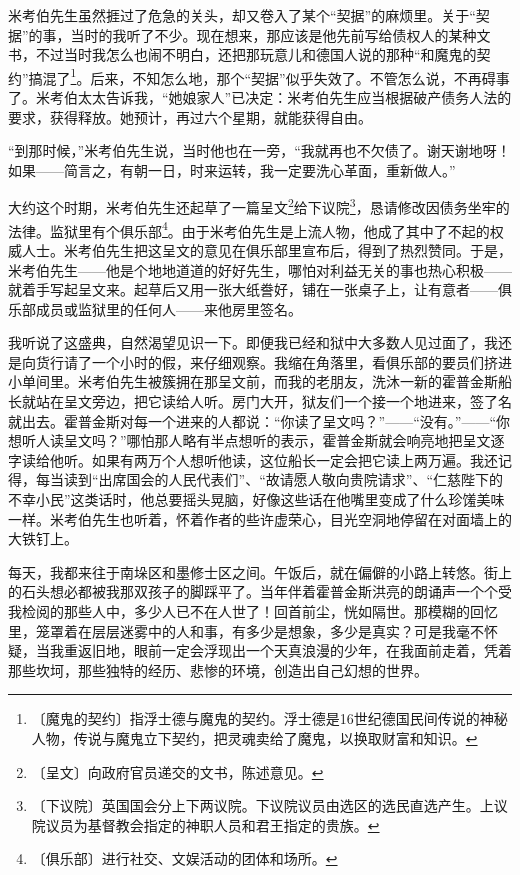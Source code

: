 \documentclass[12pt,UTF-8,openany]{ctexbook}
\begin{document}
\begin{normalsize}
    米考伯先生虽然捱过了危急的关头，却又卷入了某个“契据”的麻烦里。关于“契据”的事，当时的我听了不少。现在想来，那应该是他先前写给债权人的某种文书，不过当时我怎么也闹不明白，还把那玩意儿和德国人说的那种“和魔鬼的契约”搞混了\footnote{〔魔鬼的契约〕指浮士德与魔鬼的契约。浮士德是16世纪德国民间传说的神秘人物，传说与魔鬼立下契约，把灵魂卖给了魔鬼，以换取财富和知识。}。后来，不知怎么地，那个“契据”似乎失效了。不管怎么说，不再碍事了。米考伯太太告诉我，“她娘家人”已决定：米考伯先生应当根据破产债务人法的要求，获得释放。她预计，再过六个星期，就能获得自由。
    
    “到那时候，”米考伯先生说，当时他也在一旁，“我就再也不欠债了。谢天谢地呀！如果——简言之，有朝一日，时来运转，我一定要洗心革面，重新做人。”
    
    大约这个时期，米考伯先生还起草了一篇呈文\footnote{〔呈文〕向政府官员递交的文书，陈述意见。}给下议院\footnote{〔下议院〕英国国会分上下两议院。下议院议员由选区的选民直选产生。上议院议员为基督教会指定的神职人员和君王指定的贵族。}，恳请修改因债务坐牢的法律。监狱里有个俱乐部\footnote{〔俱乐部〕进行社交、文娱活动的团体和场所。}。由于米考伯先生是上流人物，他成了其中了不起的权威人士。米考伯先生把这呈文的意见在俱乐部里宣布后，得到了热烈赞同。于是，米考伯先生——他是个地地道道的好好先生，哪怕对利益无关的事也热心积极——就着手写起呈文来。起草后又用一张大纸誊好，铺在一张桌子上，让有意者——俱乐部成员或监狱里的任何人——来他房里签名。
    
    我听说了这盛典，自然渴望见识一下。即便我已经和狱中大多数人见过面了，我还是向货行请了一个小时的假，来仔细观察。我缩在角落里，看俱乐部的要员们挤进小单间里。米考伯先生被簇拥在那呈文前，而我的老朋友，洗沐一新的霍普金斯船长就站在呈文旁边，把它读给人听。房门大开，狱友们一个接一个地进来，签了名就出去。霍普金斯对每一个进来的人都说：“你读了呈文吗？”——“没有。”——“你想听人读呈文吗？”哪怕那人略有半点想听的表示，霍普金斯就会响亮地把呈文逐字读给他听。如果有两万个人想听他读，这位船长一定会把它读上两万遍。我还记得，每当读到“出席国会的人民代表们”、“故请愿人敬向贵院请求”、“仁慈陛下的不幸小民”这类话时，他总要摇头晃脑，好像这些话在他嘴里变成了什么珍馐美味一样。米考伯先生也听着，怀着作者的些许虚荣心，目光空洞地停留在对面墙上的大铁钉上。
    
    每天，我都来往于南垛区和墨修士区之间。午饭后，就在偏僻的小路上转悠。街上的石头想必都被我那双孩子的脚踩平了。当年伴着霍普金斯洪亮的朗诵声一个个受我检阅的那些人中，多少人已不在人世了！回首前尘，恍如隔世。那模糊的回忆里，笼罩着在层层迷雾中的人和事，有多少是想象，多少是真实？可是我毫不怀疑，当我重返旧地，眼前一定会浮现出一个天真浪漫的少年，在我面前走着，凭着那些坎坷，那些独特的经历、悲惨的环境，创造出自己幻想的世界。
    
\end{normalsize}
\end{document}
